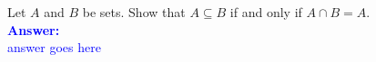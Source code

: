 \item{}
Let $A$ and $B$ be sets. Show that $A\subseteq B$ if and only if $A\cap B=A$.
\\[12pt]
\ifanswers
\textcolor{blue}{
\textbf{Answer:}\\[6pt]
answer goes here
}
\newpage
\fi
